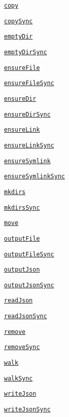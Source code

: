 \begin{DoxyItemize}
\item \href{#copy}{\tt copy}
\item \href{#copy}{\tt copy\+Sync}
\item \href{#emptydirdir-callback}{\tt empty\+Dir}
\item \href{#emptydirdir-callback}{\tt empty\+Dir\+Sync}
\item \href{#ensurefilefile-callback}{\tt ensure\+File}
\item \href{#ensurefilefile-callback}{\tt ensure\+File\+Sync}
\item \href{#ensuredirdir-callback}{\tt ensure\+Dir}
\item \href{#ensuredirdir-callback}{\tt ensure\+Dir\+Sync}
\item \href{#ensurelinksrcpath-dstpath-callback}{\tt ensure\+Link}
\item \href{#ensurelinksrcpath-dstpath-callback}{\tt ensure\+Link\+Sync}
\item \href{#ensuresymlinksrcpath-dstpath-type-callback}{\tt ensure\+Symlink}
\item \href{#ensuresymlinksrcpath-dstpath-type-callback}{\tt ensure\+Symlink\+Sync}
\item \href{#mkdirsdir-callback}{\tt mkdirs}
\item \href{#mkdirsdir-callback}{\tt mkdirs\+Sync}
\item \href{#movesrc-dest-options-callback}{\tt move}
\item \href{#outputfilefile-data-options-callback}{\tt output\+File}
\item \href{#outputfilefile-data-options-callback}{\tt output\+File\+Sync}
\item \href{#outputjsonfile-data-options-callback}{\tt output\+Json}
\item \href{#outputjsonfile-data-options-callback}{\tt output\+Json\+Sync}
\item \href{#readjsonfile-options-callback}{\tt read\+Json}
\item \href{#readjsonfile-options-callback}{\tt read\+Json\+Sync}
\item \href{#removedir-callback}{\tt remove}
\item \href{#removedir-callback}{\tt remove\+Sync}
\item \href{#walk}{\tt walk}
\item \href{#walkSyncDir}{\tt walk\+Sync}
\item \href{#writejsonfile-object-options-callback}{\tt write\+Json}
\item \href{#writejsonfile-object-options-callback}{\tt write\+Json\+Sync}
\end{DoxyItemize}

